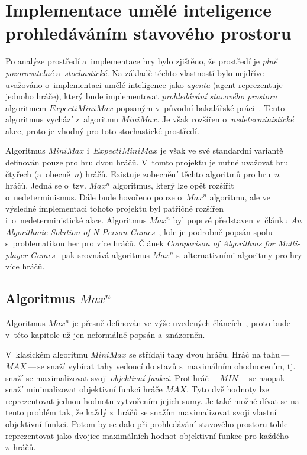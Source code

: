 \documentclass[11pt, a4paper]{article}
\theoremstyle{definition}
\begin{document}
\section{Implementace umělé inteligence prohledáváním stavového prostoru}
\label{sec:ai}

Po analýze prostředí a~implementace hry bylo zjištěno, že prostředí je
\emph{plně pozorovatelné} a~\emph{stochastické}. Na základě těchto
vlastností bylo nejdříve uvažováno o~implementaci umělé inteligence
jako \emph{agenta} (agent reprezentuje jednoho hráče), který bude
implementovat \emph{prohledávání stavového prostoru} algoritmem
$ ExpectiMiniMax $ popsaným v~původní bakalářské práci~\cite{turecekBP}.
Tento algoritmus vychází z~algoritmu $ MiniMax $. Je však rozšířen
o~\emph{nedeterministické} akce, proto je vhodný pro toto stochastické
prostředí.

Algoritmus $ MiniMax $ i~$ ExpectiMiniMax $ je však ve své standardní
variantě definován pouze pro hru dvou hráčů. V~tomto projektu je
nutné uvažovat hru čtyřech (a~obecně~$ n $) hráčů. Existuje zobecnění
těchto algoritmů pro hru~$ n $ hráčů. Jedná se o~tzv. $ Max^n $ algoritmus,
který lze opět rozšířit o~nedeterminismus. Dále bude hovořeno pouze
o~$ Max^n $ algoritmu, ale ve výsledné implementaci tohoto projektu byl
patřičně rozšířen i~o~nedeterministické akce. Algoritmus $ Max^n $ byl
poprvé představen v~článku \emph{An Algorithmic Solution of N-Person
Games}~\cite{nPersonGames}, kde je podrobně popsán spolu s~problematikou her
pro více hráčů. Článek \emph{Comparison of Algorithms for Multi-player
Games}~\cite{compMultiPlGames} pak srovnává algoritmus $ Max^n $
s~alternativními algoritmy pro hry více hráčů.

\subsection{\texorpdfstring{Algoritmus $ Max^n $}{Algoritmus MaxN}}
\label{subsec:algoritmus-max-n}

Algoritmus $ Max^n $ je přesně definován ve výše uvedených
článcích~\cite{nPersonGames, compMultiPlGames}, proto bude v~této kapitole už
jen neformálně popsán a~znázorněn.

V~klasickém algoritmu $ MiniMax $ se střídají tahy dvou hráčů. Hráč na
tahu\,---\,$ MAX $\,---\,se snaží vybírat tahy vedoucí do stavů s~maximálním
ohodnocením, tj. snaží se maximalizovat svoji \emph{objektivní funkci}.
Protihráč\,---\,$ MIN $\,---\,se naopak snaží minimalizovat objektivní funkci
hráče $ MAX $. Tyto dvě hodnoty lze reprezentovat jednou hodnotu
vytvořením jejich sumy. Je také možné dívat se na tento problém tak, že
každý z~hráčů se snažím maximalizovat svoji vlastní objektivní
funkci. Potom by se dalo při prohledávání stavového prostoru tohle
reprezentovat jako dvojice maximálních hodnot objektivní funkce pro
každého z~hráčů.
\end{document}
